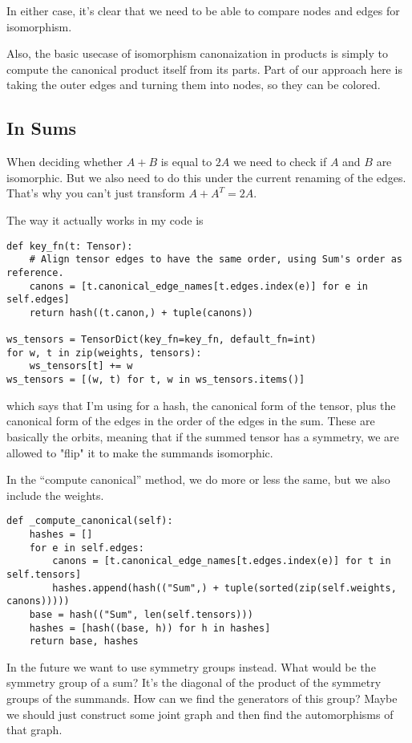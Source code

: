 In either case, it's clear that we need to be able to compare nodes and edges for isomorphism.

Also, the basic usecase of isomorphism canonaization in products is simply to compute the canonical product itself from its parts.
Part of our approach here is taking the outer edges and turning them into nodes, so they can be colored.

\subsection{In Sums}

When deciding whether $A + B$ is equal to $2A$ we need to check if $A$ and $B$ are isomorphic.
But we also need to do this under the current renaming of the edges.
That's why you can't just transform $A + A^T = 2A$.

The way it actually works in my code is
\begin{lstlisting}
def key_fn(t: Tensor):
    # Align tensor edges to have the same order, using Sum's order as reference.
    canons = [t.canonical_edge_names[t.edges.index(e)] for e in self.edges]
    return hash((t.canon,) + tuple(canons))

ws_tensors = TensorDict(key_fn=key_fn, default_fn=int)
for w, t in zip(weights, tensors):
    ws_tensors[t] += w
ws_tensors = [(w, t) for t, w in ws_tensors.items()]
\end{lstlisting}
which says that I'm using for a hash, the canonical form of the tensor, plus the canonical form of the edges in the order of the edges in the sum.
These are basically the orbits, meaning that if the summed tensor has a symmetry, we are allowed to "flip" it to make the summands isomorphic.

In the ``compute canonical'' method, we do more or less the same, but we also include the weights.
\begin{lstlisting}
def _compute_canonical(self):
    hashes = []
    for e in self.edges:
        canons = [t.canonical_edge_names[t.edges.index(e)] for t in self.tensors]
        hashes.append(hash(("Sum",) + tuple(sorted(zip(self.weights, canons)))))
    base = hash(("Sum", len(self.tensors)))
    hashes = [hash((base, h)) for h in hashes]
    return base, hashes
\end{lstlisting}

In the future we want to use symmetry groups instead.
What would be the symmetry group of a sum?
It's the diagonal of the product of the symmetry groups of the summands.
How can we find the generators of this group?
Maybe we should just construct some joint graph and then find the automorphisms of that graph.

